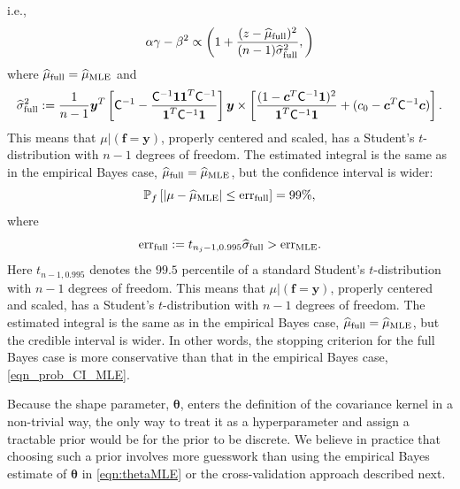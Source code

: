 \documentclass{iitthesis}          %
\newcommand{\bm}[1]{\boldsymbol{#1}}
\newcommand{\vtheta}{{\bm{\theta}}}
\newcommand{\vc}{\bm{c}}
\newcommand{\vf}{\bm{f}}
\newcommand{\vy}{\bm{y}}
\newcommand{\vone}{\bm{1}}
\newcommand{\mC}{\mathsf{C}}
\newcommand{\hmu}{\widehat{\mu}}
\newcommand{\hsigma}{\widehat{\sigma}}
\newcommand{\MLE}{\textup{MLE}}
\newcommand{\err}{\textup{err}}
\begin{document}
i.e.,
\begin{align*}
\alpha \gamma - \beta^2 \propto 
\left(
1 +  \frac{(z - \hmu_{\textup{full}})^2}{(n-1)\widehat{\sigma}_{\textup{full}}^2}, 
\right)
\end{align*}
where $\hmu_{\textup{full}} = \hmu_{\MLE}$ and 
\begin{multline*}
\hsigma^2_{\textup{full}} 
:= \frac{1}{n-1}
\vy^T\left[ \mC^{-1} 
- \frac{ \mC^{-1} \vone\vone^T \mC^{-1}}{\vone^T \mC^{-1} \vone}  \right]\vy
\times  \left[\frac{(1 - \vc^T \mC^{-1} \vone)^2}{\vone^T \mC^{-1} \vone} + (c_0  -\vc ^T \mC^{-1} \vc) \right].
\end{multline*}
This means that $\mu \vert (\vf = \vy )$, properly centered and scaled, has a Student's $t$-distribution with $n-1$ degrees of freedom.   The estimated integral is the same as in the empirical Bayes case, $\hmu_{\textup{full}} = \hmu_{\MLE}$, but the confidence interval is wider:
\begin{equation}
\label{eqn_prob_CI_full}
\mathbb{P}_f \left[
|\mu-\hmu_\MLE| \leq \err_{\textup{full}} \right]  = 99\%,
\end{equation}
where
\begin{equation*}
\err_{\textup{full}} 
:= t_{n_j-1,0.995} \hsigma_{\textup{full}} > \err_\MLE .
\end{equation*}
Here $t_{n-1,0.995}$ denotes the $99.5$ percentile of a standard Student's $t$-distribution with $n-1$ degrees of freedom. 
This means that $\mu \vert (\vf = \vy )$, properly centered and scaled, has a Student's $t$-distribution with $n-1$ degrees of freedom.  
The estimated integral is the same as in the empirical Bayes case, $\hmu_{\textup{full}} = \hmu_{\MLE}$, but the credible interval is wider.
In other words, the stopping criterion for the full Bayes case is more conservative than that in the empirical Bayes case, \eqref{eqn_prob_CI_MLE}.


Because the shape parameter, $\vtheta$, enters the definition of the covariance kernel in a non-trivial way, the only way to treat it as a hyperparameter and assign a tractable prior would be for the prior to be discrete.  We believe in practice that choosing such a prior involves more guesswork than using the empirical Bayes estimate of $\vtheta$ in \eqref{eqn:thetaMLE} or the cross-validation approach described next.

\end{document}
